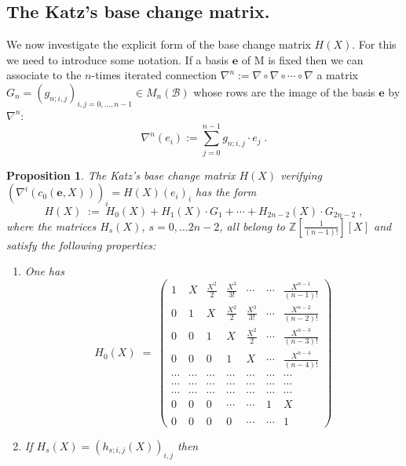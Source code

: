 \documentclass{compositio}
\newtheorem{proposition}[theorem]{Proposition}
\numberwithin{equation}{section}
\begin{document}
\subsection{The Katz's base change matrix.}
We now investigate the explicit form of the base change matrix $H(X)$. For this we need to introduce some notation. 
If a basis ${\mathbf{e}}$ of ${\mathrm{M}}$ is fixed then we can associate to the $n$-times iterated connection 
$\nabla^n:=\nabla\circ\nabla\circ\cdots\circ\nabla$ a matrix 
$G_n=(g_{n;i,j})_{i,j=0,\ldots,n-1}\in M_n({\mathscr{B}})$ whose rows are the image of the basis ${\mathbf{e}}$ by $\nabla^n$: 
\begin{equation}  
\nabla^n(e_i):=\sum_{j=0}^{n-1}g_{n;i,j}\cdot e_j\;.
\end{equation}
\begin{proposition}\label{explicit H(X)}
The Katz's base change matrix $H(X)$ verifying $(\nabla^i(c_0({\mathbf{e}},X)))_i=H(X)(e_i)_i$ has the form
\begin{equation}\label{Katz's base change matrix}
H(X)\;:=\;H_0(X)+H_1(X)\cdot G_1+\cdots+H_{2n-2}(X)\cdot G_{2n-2}\;,
\end{equation}
where the matrices $H_s(X)$, $s=0,\ldots 2n-2$, all belong to $\mathbb{Z}[\frac{1}{(n-1)!}][X]$ and satisfy the following properties:
\begin{enumerate}
\item One has
\begin{equation}
H_0(X)\;=\;\left(\begin{smallmatrix}
1&X&\frac{X^2}{2}&\frac{X^3}{3!}&\cdots&\cdots&\frac{X^{n-1}}{(n-1)!}\\
0&1&X&\frac{X^2}{2}&\frac{X^3}{3!}&\cdots&\frac{X^{n-2}}{(n-2)!}\\
0&0&1&X&\frac{X^2}{2}&\cdots&\frac{X^{n-3}}{(n-3)!}\\
0&0&0&1&X&\cdots&\frac{X^{n-4}}{(n-4)!}\\
\cdots&\cdots&\cdots&\cdots&\cdots&\cdots&\cdots\\
\cdots&\cdots&\cdots&\cdots&\cdots&\cdots&\cdots\\
\cdots&\cdots&\cdots&\cdots&\cdots&\cdots&\cdots\\
0&0&0&\cdots&\cdots&1&X\\\\
0&0&0&0&\cdots&\cdots&1
\end{smallmatrix}
\right)
\end{equation}
\item If $H_s(X)=(h_{s;i,j}(X))_{i,j}$ then
\begin{equation}

\end{equation}
\end{enumerate}
\end{proposition}
\end{document}
